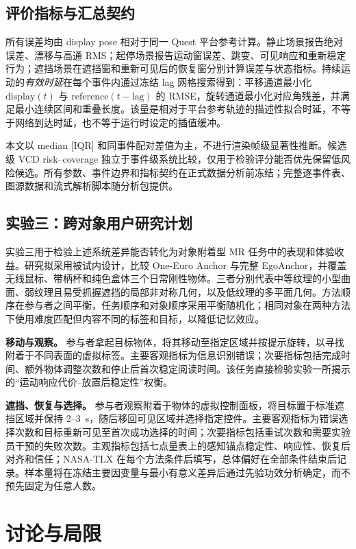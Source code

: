 \documentclass[9pt,twocolumn,letterpaper]{extarticle}
\begin{document}
\subsection{评价指标与汇总契约}

所有误差均由 display pose 相对于同一 Quest 平台参考计算。静止场景报告绝对误差、漂移与高通 RMS；起停场景报告运动窗误差、跳变、可见响应和重新稳定行为；遮挡场景在遮挡窗和重新可见后的恢复窗分别计算误差与状态指标。持续运动的\emph{有效时延}在每个事件内通过冻结 lag 网格搜索得到：平移通道最小化 $\mathrm{display}(t)$ 与 $\mathrm{reference}(t-\mathrm{lag})$ 的 RMSE，旋转通道最小化对应角残差，并满足最小连续区间和重叠长度。该量是相对于平台参考轨迹的描述性拟合时延，不等于网络到达时延，也不等于运行时设定的插值缓冲。

本文以 median [IQR] 和同事件配对差值为主，不进行渲染帧级显著性推断。候选级 VCD risk--coverage 独立于事件级系统比较，仅用于检验评分能否优先保留低风险候选。所有参数、事件边界和指标契约在正式数据分析前冻结；完整逐事件表、图源数据和流式解析脚本随分析包提供。

\subsection{实验三：跨对象用户研究计划}

实验三用于检验上述系统差异能否转化为对象附着型 MR 任务中的表现和体验收益。研究拟采用被试内设计，比较 One-Euro Anchor 与完整 EgoAnchor，并覆盖无线鼠标、带柄杯和纯色盒体三个日常刚性物体。三者分别代表中等纹理的小型曲面、弱纹理且易受抓握遮挡的局部非对称几何，以及低纹理的多平面几何。方法顺序在参与者之间平衡，任务顺序和对象顺序采用平衡随机化；相同对象在两种方法下使用难度匹配但内容不同的标签和目标，以降低记忆效应。

\textbf{移动与观察。} 参与者拿起目标物体，将其移动至指定区域并按提示旋转，以寻找附着于不同表面的虚拟标签。主要客观指标为信息识别错误；次要指标包括完成时间、额外物体调整次数和停止后首次稳定阅读时间。该任务直接检验实验一所揭示的“运动响应代价--放置后稳定性”权衡。

\textbf{遮挡、恢复与选择。} 参与者观察附着于物体的虚拟控制面板，将目标置于标准遮挡区域并保持 2--3~s，随后移回可见区域并选择指定控件。主要客观指标为错误选择次数和目标重新可见至首次成功选择的时间；次要指标包括重试次数和需要实验员干预的失败次数。主观指标包括七点量表上的感知锚点稳定性、响应性、恢复后对齐和信任；NASA-TLX 在每个方法条件后填写，总体偏好在全部条件结束后记录。样本量将在冻结主要因变量与最小有意义差异后通过先验功效分析确定，而不预先固定为任意人数。

\section{讨论与局限}\label{sec:discussion}
\end{document}
